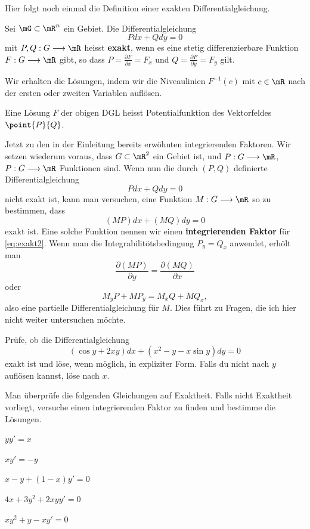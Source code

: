 \documentclass[%
draft,
11pt,%
twoside,%
titlepage,%
german,%
headsepline%
]{scrartcl}
\begin{document}
Hier folgt noch einmal die Definition einer exakten Differentialgleichung.
\begin{defn}
Sei
$\mG\subset\mR^n$ ein Gebiet. Die Differentialgleichung
$$Pdx+Qdy=0$$
mit $P,Q:G\longrightarrow\mR$ heisst \textbf{exakt}, wenn es eine stetig differenzierbare Funktion $F:G\longrightarrow\mR$ gibt, so dass $P=\frac{\partial F}{\partial x}=F_x$ und $Q=\frac{\partial F}{\partial y}=F_y$ gilt.
\end{defn}
\noindent Wir erhalten die L\"osungen, indem wir die Niveaulinien $F^{-1}(c)$ mit $c\in\mR$ nach der ersten oder zweiten Variablen aufl\"osen.

\begin{bem}
Eine L\"osung $F$ der obigen DGL heisst Potentialfunktion des Vektorfeldes $\point{P}{Q}$.
\end{bem}

Jetzt zu den in der Einleitung bereits erw\"ohnten integrierenden Faktoren. Wir setzen wiederum voraus, dass $G\subset\mR^2$ ein Gebiet ist, und $P:G\longrightarrow\mR$, $P:G\longrightarrow\mR$ Funktionen sind. Wenn nun die durch $(P,Q)$ definierte Differentialgleichung
\begin{equation}\label{eq:exakt2}
Pdx+Qdy=0
\end{equation}
nicht exakt ist, kann man versuchen, eine Funktion $M:G\longrightarrow\mR$ so zu bestimmen, dass
$$(MP)dx+(MQ)dy=0$$
exakt ist. Eine solche Funktion nennen wir einen \textbf{integrierenden Faktor} f\"ur \eqref{eq:exakt2}. Wenn man die Integrabilit\"otsbedingung $P_y=Q_x$ anwendet, erh\"olt man
$$\frac{\partial(MP)}{\partial y}=\frac{\partial(MQ)}{\partial x}$$
oder
$$M_yP+MP_y=M_xQ+MQ_x,$$
also eine partielle Differentialgleichung f\"ur $M$. Dies f\"uhrt zu Fragen, die ich hier nicht weiter untersuchen m\"ochte.

\begin{ueb}
Pr\"ufe, ob die Differentialgleichung
$$(\cos y+2xy)dx+(x^2-y-x\sin y)dy=0$$
exakt ist und l\"ose, wenn m\"oglich, in expliziter Form. Falls du nicht nach $y$ aufl\"osen kannst, l\"ose nach $x$.
\end{ueb}


\begin{ueb}
Man \"uberpr\"ufe die folgenden Gleichungen auf Exaktheit. Falls nicht Exaktheit vorliegt, versuche einen integrierenden Faktor zu finden und bestimme die L\"osungen.
\begin{enumeratea}
\item $yy'=x$
\item $xy'=-y$
\item $x-y+(1-x)y'=0$
\item $4x+3y^2+2xyy'=0$
\item $xy^2+y-xy'=0$
\end{enumeratea}
\end{ueb}
\end{document}

